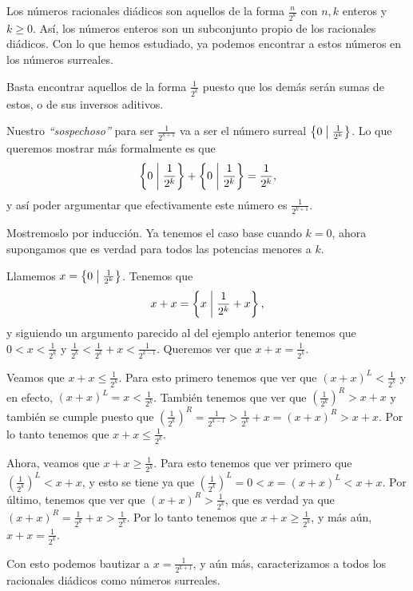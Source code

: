     \begin{example}
        \label{Ex_num_diadicos}
        Los n\'umeros racionales di\'adicos son aquellos de la forma $\frac{n}{2^k}$ con $n, k$ enteros y $k \ge 0$. As\'i, los n\'umeros enteros son un subconjunto propio de los racionales di\'adicos. Con lo que hemos estudiado, ya podemos encontrar a estos n\'umeros en los n\'umeros surreales.

        Basta encontrar aquellos de la forma $\frac{1}{2^k}$ puesto que los dem\'as ser\'an sumas de estos, o de sus inversos aditivos.

        Nuestro \textit{``sospechoso''} para ser $\frac{1}{2^{k+1}}$ va a ser el n\'umero surreal $\left\{0\;\middle|\; \frac{1}{2^k}\right\}$. Lo que queremos mostrar m\'as formalmente es que 
        \[
            \left\{0\;\middle|\; \frac{1}{2^{k}}\right\} + \left\{0\;\middle|\; \frac{1}{2^{k}}\right\} = \frac{1}{2^k},
        \]
        y as\'i poder argumentar que efectivamente este n\'umero es $\frac{1}{2^{k+1}}$. 
        
        Mostremoslo por inducci\'on. Ya tenemos el caso base cuando $k=0$, ahora supongamos que es verdad para todos las potencias menores a $k$.

        Llamemos $x = \left\{0\;\middle|\; \frac{1}{2^{k}}\right\}$. Tenemos que
        \[
            x + x = \left\{x\;\middle|\; \frac{1}{2^k} + x\right\},
        \]
        y siguiendo un argumento parecido al del ejemplo anterior tenemos que $0 < x < \frac{1}{2^k}$ y $\frac{1}{2^k} < \frac{1}{2^k} + x < \frac{1}{2^{k-1}}$. Queremos ver que $x+x = \frac{1}{2^{k}}$.

        Veamos que $x+x\le \frac{1}{2^k}$. Para esto primero tenemos que ver que $(x+x)^L < \frac{1}{2^k}$ y en efecto, $(x+x)^L = x < \frac{1}{2^k}$. Tambi\'en tenemos que ver que $(\frac{1}{2^k})^R > x+x$ y tambi\'en se cumple puesto que $(\frac{1}{2^k})^R = \frac{1}{2^{k-1}} > \frac{1}{2^k} + x = (x+x)^R > x+x$. Por lo tanto tenemos que $x+x\le \frac{1}{2^k}$.

        Ahora, veamos que $x+x\ge \frac{1}{2^k}$. Para esto tenemos que ver primero que $(\frac{1}{2^k})^L < x+x$, y esto se tiene ya que $(\frac{1}{2^k})^L = 0 < x = (x+x)^L < x+x$. Por \'ultimo, tenemos que ver que $(x+x)^R > \frac{1}{2^k}$, que es verdad ya que $(x+x)^R = \frac{1}{2^k} + x > \frac{1}{2^k}$. Por lo tanto tenemos que $x+x\ge \frac{1}{2^k}$, y m\'as a\'un, $x+x = \frac{1}{2^k}$.

        Con esto podemos bautizar a $x = \frac{1}{2^{k+1}}$, y a\'un m\'as, caracterizamos a todos los racionales di\'adicos como n\'umeros surreales.

    \end{example}


